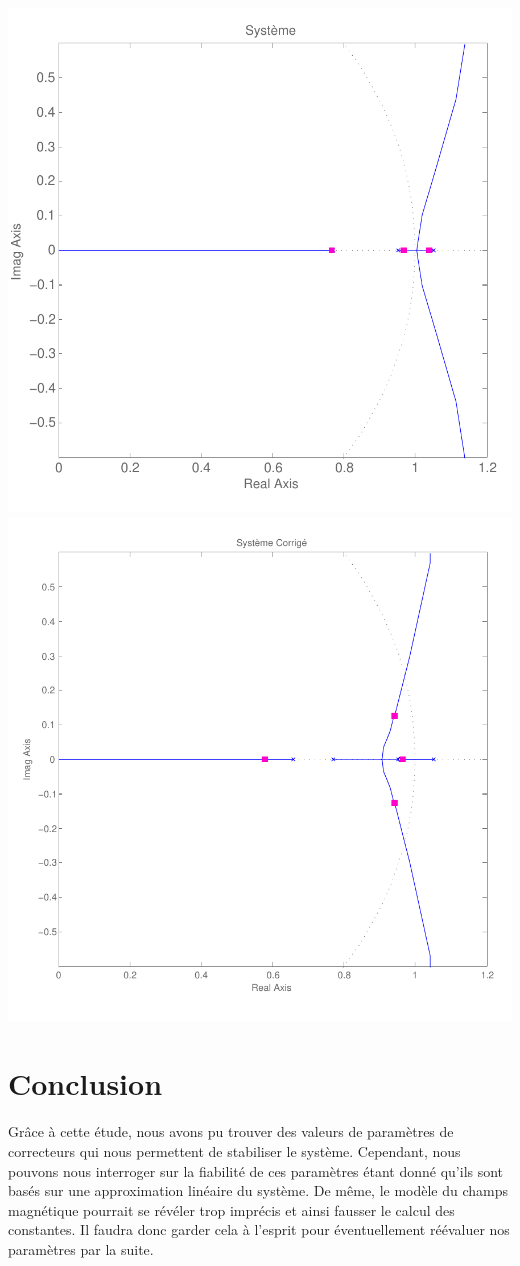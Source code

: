 \documentclass[11pt, french]{article} %
\begin{document}
\includegraphics[scale=0.50]{RLN_Sys_Seul.pdf}
\includegraphics[scale=0.50]{RLN_Sys_AvPh_K5.pdf}

\section{Conclusion}

Grâce à cette étude, nous avons pu trouver des valeurs de paramètres de correcteurs qui nous permettent de stabiliser le système. Cependant, nous pouvons nous interroger sur la fiabilité de ces paramètres étant donné qu'ils sont basés sur une approximation linéaire du système. De même, le modèle du champs magnétique pourrait se révéler trop imprécis et ainsi fausser le calcul des constantes. Il faudra donc garder cela à l'esprit pour éventuellement réévaluer nos paramètres par la suite. 
\end{document}

